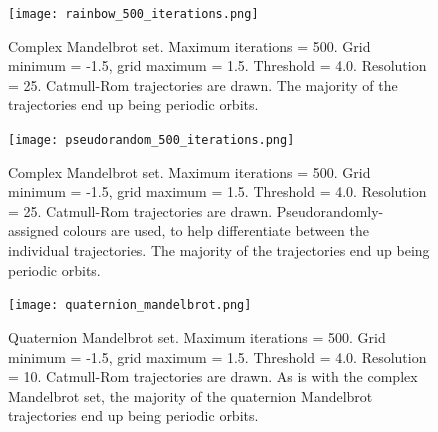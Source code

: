 \documentclass[12pt]{article}
\begin{document}
\begin{figure} 
\centering
  \texttt{[image: rainbow\_500\_iterations.png]}	
  \caption{
Complex Mandelbrot set.
Maximum iterations = 500.
Grid minimum = -1.5, grid maximum = 1.5.
Threshold = 4.0. 
Resolution = 25.
Catmull-Rom trajectories are drawn.
The majority of the trajectories end up being periodic orbits.}
\end{figure}

\begin{figure} 
\centering
  \texttt{[image: pseudorandom\_500\_iterations.png]}	
  \caption{
Complex Mandelbrot set.
Maximum iterations = 500.
Grid minimum = -1.5, grid maximum = 1.5.
Threshold = 4.0.
Resolution = 25.
Catmull-Rom trajectories are drawn.
Pseudorandomly-assigned colours are used, to help differentiate between the individual trajectories.
The majority of the trajectories end up being periodic orbits.}
\end{figure}


\begin{figure} 
\centering
  \texttt{[image: quaternion\_mandelbrot.png]}	
  \caption{
Quaternion Mandelbrot set.
Maximum iterations = 500.
Grid minimum = -1.5, grid maximum = 1.5.
Threshold = 4.0.
Resolution = 10.
Catmull-Rom trajectories are drawn.
As is with the complex Mandelbrot set, the majority of the quaternion Mandelbrot trajectories end up being periodic orbits.}
\end{figure}
\end{document}
